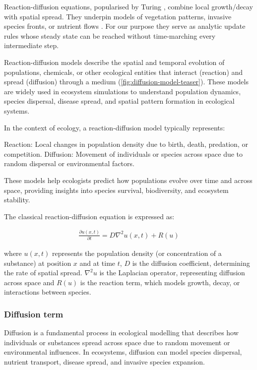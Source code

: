 Reaction-diffusion equations, popularised by Turing \cite{Turing1952}, combine local growth/decay with spatial spread. They underpin models of vegetation patterns, invasive species fronts, or nutrient flows \cite{Cosner2008}. For our purpose they serve as analytic update rules whose steady state can be reached without time-marching every intermediate step.

Reaction-diffusion models describe the spatial and temporal evolution of populations, chemicals, or other ecological entities that interact (reaction) and spread (diffusion) through a medium (\cref{fig:diffusion-model-teaser}). These models are widely used in ecosystem simulations to understand population dynamics, species dispersal, disease spread, and spatial pattern formation in ecological systems.

In the context of ecology, a reaction-diffusion model typically represents:
\begin{Itemize}
\Item{} Reaction: Local changes in population density due to birth, death, predation, or competition.
\Item{} Diffusion: Movement of individuals or species across space due to random dispersal or environmental factors.
\end{Itemize}
These models help ecologists predict how populations evolve over time and across space, providing insights into species survival, biodiversity, and ecosystem stability.

The classical reaction-diffusion equation is expressed as:

\begin{align}
\label{eq:env-obj-classic-reaction-diffusion}
\frac{\partial u (x, t)}{\partial t} = D \nabla^2 u(x, t) + R(u)
\end{align}

where $u(x,t)$ represents the population density (or concentration of a substance) at position $x$ and at time $t$, $D$ is the diffusion coefficient, determining the rate of spatial spread. $\nabla^2 u$ is the Laplacian operator, representing diffusion across space and $R(u)$ is the reaction term, which models growth, decay, or interactions between species.

\subsubsection{Diffusion term}
Diffusion is a fundamental process in ecological modelling that describes how individuals or substances spread across space due to random movement or environmental influences. In ecosystems, diffusion can model species dispersal, nutrient transport, disease spread, and invasive species expansion.

